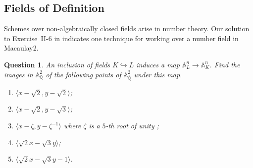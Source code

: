 \documentclass[12pt,noamsfonts]{amsart}
\def\AA{{\mathbb A}}
\def\QQ{{\mathbb Q}}
\newtheorem{question}{Question}
\theoremstyle{definition}
\theoremstyle{remark}
\begin{document}
\subsection*{Fields of Definition}

Schemes over non-algebraically closed fields arise in number theory.
Our solution to Exercise~II-6 in \cite{EH}
indicates one technique for working over a number field in {\sc
Macaulay2}.

\begin{question}
An inclusion of fields $K \hookrightarrow L$ induces a map
$\AA_{L}^{n} \to \AA_{K}^{n}$.  Find the images in $\AA_{\QQ}^{2}$ of
the following points of $\AA_{\overline{\QQ}}^{2}$ under this map.
\begin{enumerate}
\item[(a)]  $\langle x - \sqrt{2}, y - \sqrt{2} \rangle$;
\item[(b)]  $\langle x - \sqrt{2}, y - \sqrt{3} \rangle$;  
\item[(c)]  $\langle x - \zeta, y - \zeta^{-1} \rangle$ where $\zeta$ is
a $5$-th root of unity ;
\item[(d)]  $\langle \sqrt{2}x- \sqrt{3}y \rangle$;
\item[(e)]  $\langle \sqrt{2}x- \sqrt{3}y-1 \rangle$.
\end{enumerate}
\end{question}
\end{document}
